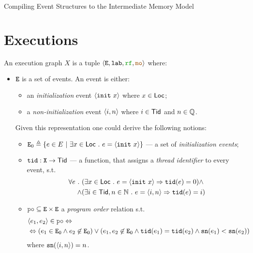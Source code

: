 \documentclass[12pt]{article}
\begin{document}
\begin{center}
{\center \LARGE Compiling Event Structures to the Intermediate Memory Model }
\end{center}

\section{Executions}

\begin{definition}
  \label{def:exec}
  
  An execution graph $X$ is a tuple $\tup{\lE, \lLAB, \lRF, \lMO}$ where:
  \begin{itemize}

    \item ${\mathtt{E}}$ is a set of events. 
    An event is either:
    \begin{itemize}
      \item an \emph{initialization} event $\langle {\mathtt{init}}~x \rangle$ where $x \in \mathsf{Loc}$;
      \item a \emph{non-initialization} event $\langle i, n \rangle$ where $i \in \mathsf{Tid}$ and $n \in {\mathbb{Q}}$.
    \end{itemize}
    Given this representation one could derive the following notions:
    \begin{itemize}

      \item ${\mathtt{E}}_{0} \triangleq \{e \in E ~|~ \exists{x} \in \mathsf{Loc} ~.~ e = \langle {\mathtt{init}}~x \rangle\}$ ---
      a set of \emph{initialization events};

      \item ${\mathtt{tid}} : {\mathtt{X}} \rightarrow \mathsf{Tid}$ ---
      a function, that assigns a \emph{thread identifier} to every event, s.t. \\
      \begin{equation*}
        \begin{split}
          \forall{e} ~.~
          & (\exists{x \in \mathsf{Loc}} ~.~ e = \langle {\mathtt{init}}~x \rangle \Rightarrow {\mathtt{tid}}(e) = 0) \wedge \\ \wedge
          & (\exists{i \in \mathsf{Tid}, n \in {\mathbb{N}}} ~.~ e = \langle i, n \rangle \Rightarrow {\mathtt{tid}}(e) = i)
        \end{split}
      \end{equation*}
      
      \item $\lPO \subseteq \lE \times \lE$ a \emph{program order} relation s.t. \\
      \begin{equation*}
        \begin{split}
          & \tup{e_1, e_2} \in \lPO \Leftrightarrow \\
          & \Leftrightarrow (e_1 \in \lEo \wedge e_2 \not\in \lEo) \vee 
          (e_1, e_2 \not\in \lEo \wedge \lTID(e_1) = \lTID(e_2) \wedge
          \lSN(e_1) < \lSN(e_2))
        \end{split}
      \end{equation*}
      where ${\mathtt{sn}}(\langle i, n \rangle) = n$.


\end{itemize}
\end{itemize}
\end{definition}
\end{document}

